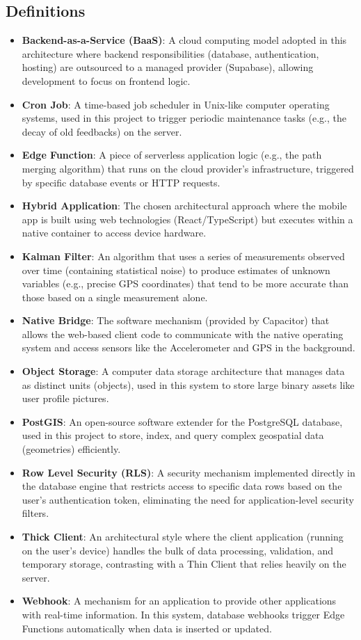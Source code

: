 \subsection{Definitions}
\begin{itemize}
    \item \textbf{Backend-as-a-Service (BaaS)}: A cloud computing model adopted in this architecture where backend responsibilities (database, authentication, hosting) are outsourced to a managed provider (Supabase), allowing development to focus on frontend logic.
    \item \textbf{Cron Job}: A time-based job scheduler in Unix-like computer operating systems, used in this project to trigger periodic maintenance tasks (e.g., the decay of old feedbacks) on the server.
    \item \textbf{Edge Function}: A piece of serverless application logic (e.g., the path merging algorithm) that runs on the cloud provider's infrastructure, triggered by specific database events or HTTP requests.
    \item \textbf{Hybrid Application}: The chosen architectural approach where the mobile app is built using web technologies (React/TypeScript) but executes within a native container to access device hardware.
    \item \textbf{Kalman Filter}: An algorithm that uses a series of measurements observed over time (containing statistical noise) to produce estimates of unknown variables (e.g., precise GPS coordinates) that tend to be more accurate than those based on a single measurement alone.
    \item \textbf{Native Bridge}: The software mechanism (provided by Capacitor) that allows the web-based client code to communicate with the native operating system and access sensors like the Accelerometer and GPS in the background.
    \item \textbf{Object Storage}: A computer data storage architecture that manages data as distinct units (objects), used in this system to store large binary assets like user profile pictures.
    \item \textbf{PostGIS}: An open-source software extender for the PostgreSQL database, used in this project to store, index, and query complex geospatial data (geometries) efficiently.
    \item \textbf{Row Level Security (RLS)}: A security mechanism implemented directly in the database engine that restricts access to specific data rows based on the user's authentication token, eliminating the need for application-level security filters.
    \item \textbf{Thick Client}: An architectural style where the client application (running on the user's device) handles the bulk of data processing, validation, and temporary storage, contrasting with a Thin Client that relies heavily on the server.
    \item \textbf{Webhook}: A mechanism for an application to provide other applications with real-time information. In this system, database webhooks trigger Edge Functions automatically when data is inserted or updated.
\end{itemize}

